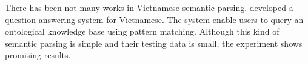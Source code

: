 There has been not many works in Vietnamese semantic parsing. \citeauthor{Nguyen:2009:VQA:1681518.1683170} developed a question answering system for Vietnamese. The system enable users to query an ontological knowledge base using pattern matching. Although this kind of semantic parsing is simple and their testing data is small, the experiment shows promising results. 